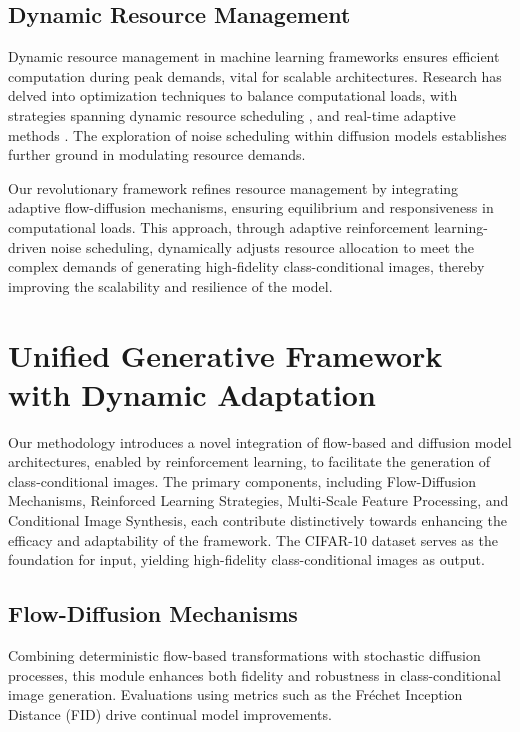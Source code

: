 \documentclass{article} %
\begin{document}
\subsection{Dynamic Resource Management}

Dynamic resource management in machine learning frameworks ensures efficient computation during peak demands, vital for scalable architectures. Research has delved into optimization techniques to balance computational loads, with strategies spanning dynamic resource scheduling \citep{bertsimas2011theory}, and real-time adaptive methods \citep{gregor2015draw, paszke2019pytorch}. The exploration of noise scheduling within diffusion models \citep{vincent2011connection} establishes further ground in modulating resource demands.

Our revolutionary framework refines resource management by integrating adaptive flow-diffusion mechanisms, ensuring equilibrium and responsiveness in computational loads. This approach, through adaptive reinforcement learning-driven noise scheduling, dynamically adjusts resource allocation to meet the complex demands of generating high-fidelity class-conditional images, thereby improving the scalability and resilience of the model.


\section{Unified Generative Framework with Dynamic Adaptation}

Our methodology introduces a novel integration of flow-based and diffusion model architectures, enabled by reinforcement learning, to facilitate the generation of class-conditional images. The primary components, including Flow-Diffusion Mechanisms, Reinforced Learning Strategies, Multi-Scale Feature Processing, and Conditional Image Synthesis, each contribute distinctively towards enhancing the efficacy and adaptability of the framework. The CIFAR-10 dataset serves as the foundation for input, yielding high-fidelity class-conditional images as output.

\subsection{Flow-Diffusion Mechanisms}
Combining deterministic flow-based transformations with stochastic diffusion processes, this module enhances both fidelity and robustness in class-conditional image generation. Evaluations using metrics such as the Fréchet Inception Distance (FID) drive continual model improvements.
\end{document}
